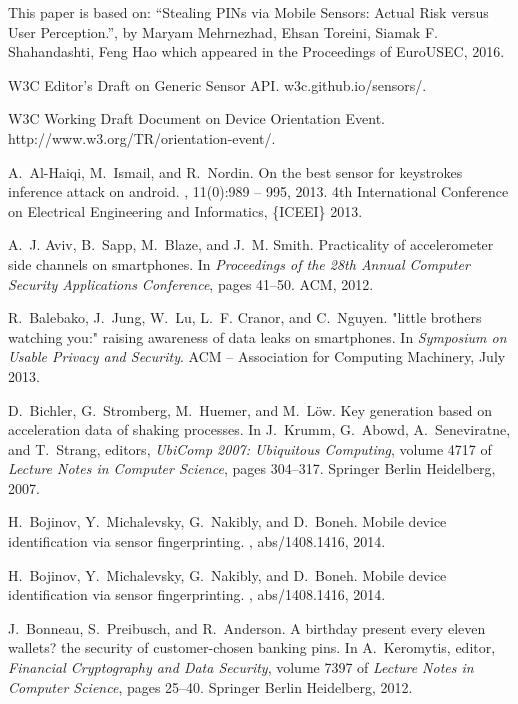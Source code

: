 \documentclass[10pt,twocolumn]{article}
\begin{document}
This paper is based on: “Stealing PINs via Mobile Sensors: Actual Risk versus User Perception.”, by Maryam Mehrnezhad, Ehsan Toreini, Siamak F. Shahandashti, Feng Hao which appeared in the Proceedings of EuroUSEC, 2016.

\begin{thebibliography}{10}

{W3C Editor's Draft on Generic Sensor API}.
\newblock w3c.github.io/sensors/.

{W3C Working Draft Document on Device Orientation Event}.
\newblock http://www.w3.org/TR/orientation-event/.

A.~Al-Haiqi, M.~Ismail, and R.~Nordin.
\newblock On the best sensor for keystrokes inference attack on android.
, 11(0):989 -- 995, 2013.
\newblock 4th International Conference on Electrical Engineering and
  Informatics, \{ICEEI\} 2013.

A.~J. Aviv, B.~Sapp, M.~Blaze, and J.~M. Smith.
\newblock Practicality of accelerometer side channels on smartphones.
\newblock In {\em Proceedings of the 28th Annual Computer Security Applications
  Conference}, pages 41--50. ACM, 2012.

R.~Balebako, J.~Jung, W.~Lu, L.~F. Cranor, and C.~Nguyen.
\newblock "little brothers watching you:" raising awareness of data leaks on
  smartphones.
\newblock In {\em Symposium on Usable Privacy and Security}. ACM –
  Association for Computing Machinery, July 2013.

D.~Bichler, G.~Stromberg, M.~Huemer, and M.~L\"{o}w.
\newblock Key generation based on acceleration data of shaking processes.
\newblock In J.~Krumm, G.~Abowd, A.~Seneviratne, and T.~Strang, editors, {\em
  UbiComp 2007: Ubiquitous Computing}, volume 4717 of {\em Lecture Notes in
  Computer Science}, pages 304--317. Springer Berlin Heidelberg, 2007.

H.~Bojinov, Y.~Michalevsky, G.~Nakibly, and D.~Boneh.
\newblock Mobile device identification via sensor fingerprinting.
, abs/1408.1416, 2014.

H.~Bojinov, Y.~Michalevsky, G.~Nakibly, and D.~Boneh.
\newblock Mobile device identification via sensor fingerprinting.
, abs/1408.1416, 2014.

J.~Bonneau, S.~Preibusch, and R.~Anderson.
\newblock A birthday present every eleven wallets? the security of
  customer-chosen banking pins.
\newblock In A.~Keromytis, editor, {\em Financial Cryptography and Data
  Security}, volume 7397 of {\em Lecture Notes in Computer Science}, pages
  25--40. Springer Berlin Heidelberg, 2012.


\end{thebibliography}
\end{document}
